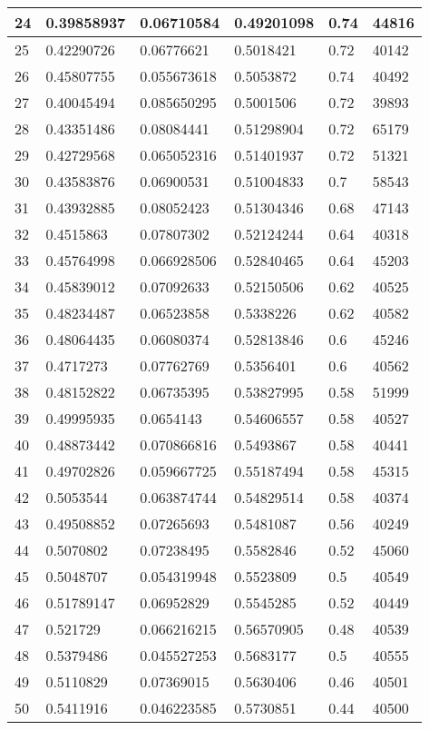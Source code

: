 \begin{longtable}{|l|l|l|l|l|l|}
24 & 0.39858937 & 0.06710584 & 0.49201098 & 0.74 & 44816 \\ \hline 
25 & 0.42290726 & 0.06776621 & 0.5018421 & 0.72 & 40142 \\ \hline 
26 & 0.45807755 & 0.055673618 & 0.5053872 & 0.74 & 40492 \\ \hline 
27 & 0.40045494 & 0.085650295 & 0.5001506 & 0.72 & 39893 \\ \hline 
28 & 0.43351486 & 0.08084441 & 0.51298904 & 0.72 & 65179 \\ \hline 
29 & 0.42729568 & 0.065052316 & 0.51401937 & 0.72 & 51321 \\ \hline 
30 & 0.43583876 & 0.06900531 & 0.51004833 & 0.7 & 58543 \\ \hline 
31 & 0.43932885 & 0.08052423 & 0.51304346 & 0.68 & 47143 \\ \hline 
32 & 0.4515863 & 0.07807302 & 0.52124244 & 0.64 & 40318 \\ \hline 
33 & 0.45764998 & 0.066928506 & 0.52840465 & 0.64 & 45203 \\ \hline 
34 & 0.45839012 & 0.07092633 & 0.52150506 & 0.62 & 40525 \\ \hline 
35 & 0.48234487 & 0.06523858 & 0.5338226 & 0.62 & 40582 \\ \hline 
36 & 0.48064435 & 0.06080374 & 0.52813846 & 0.6 & 45246 \\ \hline 
37 & 0.4717273 & 0.07762769 & 0.5356401 & 0.6 & 40562 \\ \hline 
38 & 0.48152822 & 0.06735395 & 0.53827995 & 0.58 & 51999 \\ \hline 
39 & 0.49995935 & 0.0654143 & 0.54606557 & 0.58 & 40527 \\ \hline 
40 & 0.48873442 & 0.070866816 & 0.5493867 & 0.58 & 40441 \\ \hline 
41 & 0.49702826 & 0.059667725 & 0.55187494 & 0.58 & 45315 \\ \hline 
42 & 0.5053544 & 0.063874744 & 0.54829514 & 0.58 & 40374 \\ \hline 
43 & 0.49508852 & 0.07265693 & 0.5481087 & 0.56 & 40249 \\ \hline 
44 & 0.5070802 & 0.07238495 & 0.5582846 & 0.52 & 45060 \\ \hline 
45 & 0.5048707 & 0.054319948 & 0.5523809 & 0.5 & 40549 \\ \hline 
46 & 0.51789147 & 0.06952829 & 0.5545285 & 0.52 & 40449 \\ \hline 
47 & 0.521729 & 0.066216215 & 0.56570905 & 0.48 & 40539 \\ \hline 
48 & 0.5379486 & 0.045527253 & 0.5683177 & 0.5 & 40555 \\ \hline 
49 & 0.5110829 & 0.07369015 & 0.5630406 & 0.46 & 40501 \\ \hline 
50 & 0.5411916 & 0.046223585 & 0.5730851 & 0.44 & 40500 \\ \hline 
\end{longtable}